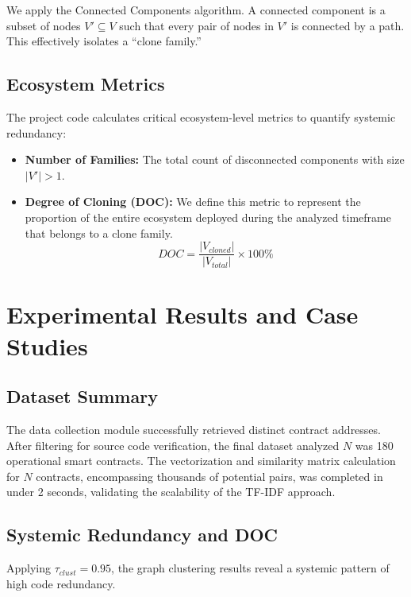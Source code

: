\documentclass[12pt,a4paper]{article}
\begin{document}
We apply the Connected Components algorithm. A connected component is a subset of nodes $V' \subseteq V$ such that every pair of nodes in $V'$ is connected by a path. This effectively isolates a ``clone family.''

\subsection{Ecosystem Metrics}
The project code calculates critical ecosystem-level metrics to quantify systemic redundancy:
\begin{itemize}
    \item \textbf{Number of Families:} The total count of disconnected components with size $|V'| > 1$.
    \item \textbf{Degree of Cloning (DOC):} We define this metric to represent the proportion of the entire ecosystem deployed during the analyzed timeframe that belongs to a clone family.
    $$ DOC = \frac{|V_{cloned}|}{|V_{total}|} \times 100\% $$
\end{itemize}

\section{Experimental Results and Case Studies}

\subsection{Dataset Summary}
The data collection module successfully retrieved distinct contract addresses. After filtering for source code verification, the final dataset analyzed $N$ was 180 operational smart contracts. The vectorization and similarity matrix calculation for $N$ contracts, encompassing thousands of potential pairs, was completed in under 2 seconds, validating the scalability of the TF-IDF approach.

\subsection{Systemic Redundancy and DOC}
Applying $\tau_{clust} = 0.95$, the graph clustering results reveal a systemic pattern of high code redundancy.
\end{document}
